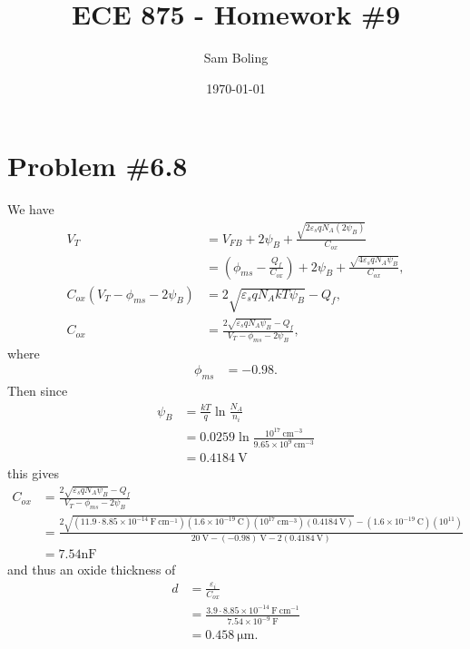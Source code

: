 \documentclass{article}
\title{ECE 875 - Homework \#9}
\author{Sam Boling}
\date{\today}
\begin{document}
\maketitle

\section*{Problem \#6.8}

We have
\begin{align*}
V_T &= V_{FB} 
     + 2\psi_B 
     + \frac{\sqrt{2 \varepsilon_s q N_A (2 \psi_B)}}{C_{ox}} \\
    &= \left(\phi_{ms} - \frac{Q_f}{C_{ox}}\right)       
     + 2\psi_B
     + \frac{\sqrt{4 \varepsilon_s q N_A \psi_{B}}}{C_{ox}}, \\
C_{ox} (V_T  - \phi_{ms} - 2\psi_{B}) &= 2\sqrt{\varepsilon_s q N_A kT \psi_B} - Q_f, \\
C_{ox} &= \frac{2 \sqrt{\varepsilon_s q N_A \psi_B} - Q_f}
               {V_T - \phi_{ms} - 2\psi_B},
\end{align*}
where
\begin{align*}
\phi_{ms} &= -0.98.
\end{align*}
Then since
\begin{align*}
\psi_B &= \frac{kT}{q} \ln \frac{N_A}{n_i} \\
       &= 0.0259 \ln \frac{10^{17} ~\mathrm{cm}^{-3}}{9.65 \times 10^{9} ~\mathrm{cm}^{-3}} \\
       &= 0.4184 ~\mathrm{V}
\end{align*}
this gives
\begin{align*}
C_{ox} &= \frac{2 \sqrt{\varepsilon_s q N_A \psi_B} - Q_f}
               {V_T - \phi_{ms} - 2\psi_B} \\
       &= \frac{2 \sqrt{(11.9 \cdot 8.85 \times 10^{-14} ~\mathrm{F}~\mathrm{cm}^{-1})
                        (1.6 \times 10^{-19} ~\mathrm{C})
                        (10^{17} ~\mathrm{cm}^{-3})
                        (0.4184 ~\mathrm{V})} 
                - (1.6 \times 10^{-19} ~\mathrm{C})
                  (10^{11})}
                       {20 ~\mathrm{V} - (-0.98)~\mathrm{V} - 2(0.4184 ~\mathrm{V})} \\
       &= 7.54 \mathrm{nF}
\end{align*}
and thus an oxide thickness of
\begin{align*}
d &= \frac{\varepsilon_{i}}{C_{ox}} \\
  &= \frac{3.9 \cdot 8.85 \times 10^{-14} ~\mathrm{F}~\mathrm{cm}^{-1}}
          {7.54 \times 10^{-9} ~\mathrm{F}} \\
  &= 0.458 ~\mathrm{\mu m}.
\end{align*}
\end{document}
